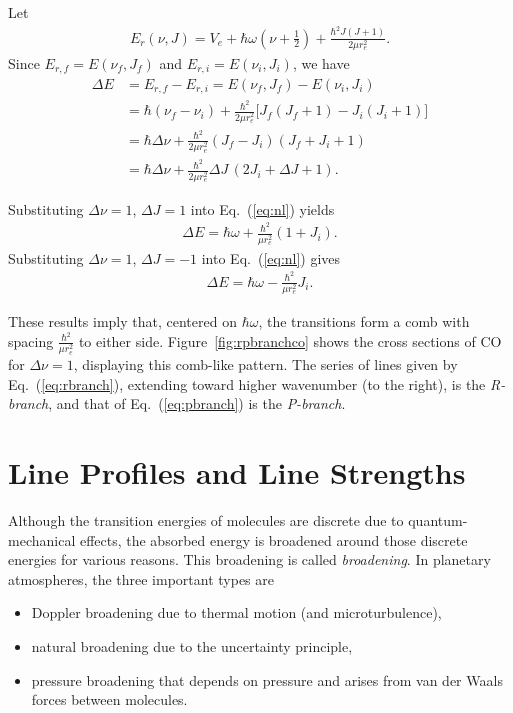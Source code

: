 Let
\begin{align}
E_r(\nu,J) = V_e + \hbar \omega \left( \nu + \frac{1}{2} \right) + \frac{\hbar^2 J(J+1)}{2 \mu r_e^2}.
\end{align}
Since $E_{r,f} = E(\nu_f, J_f)$ and $E_{r,i}=E(\nu_i,J_i)$, we have
\begin{align}
\Delta E &= E_{r,f} - E_{r,i} = E(\nu_f, J_f) - E(\nu_i,J_i) \\
&= \hbar (\nu_f - \nu_i) + \frac{\hbar^2}{2 \mu r_e^2} \bigl[J_f(J_f+1) - J_i(J_i+1)\bigr] \\
&= \hbar \Delta \nu + \frac{\hbar^2}{2 \mu r_e^2} (J_f-J_i)(J_f + J_i + 1) \\
\label{eq:nl}
&= \hbar \Delta \nu + \frac{\hbar^2}{2 \mu r_e^2} \Delta J \,(2 J_i + \Delta J + 1).
\end{align}

Substituting $\Delta \nu = 1$, $\Delta J = 1$ into Eq.~(\ref{eq:nl}) yields
\begin{align}
\label{eq:rbranch}
\Delta E = \hbar \omega + \frac{\hbar^2}{\mu r_e^2} (1 + J_i).
\end{align}
Substituting $\Delta \nu = 1$, $\Delta J = -1$ into Eq.~(\ref{eq:nl}) gives
\begin{align}
\label{eq:pbranch}
\Delta E = \hbar \omega - \frac{\hbar^2}{\mu r_e^2} J_i.
\end{align}

These results imply that, centered on $\hbar \omega$, the transitions form a comb with spacing $\frac{\hbar^2}{\mu r_e^2}$ to either side. Figure~\ref{fig:rpbranchco} shows the cross sections of CO for $\Delta \nu =1$, displaying this comb-like pattern. The series of lines given by Eq.~(\ref{eq:rbranch}), extending toward higher wavenumber (to the right), is the \emph{R-branch}, and that of Eq.~(\ref{eq:pbranch}) is the \emph{P-branch}.

\section{Line Profiles and Line Strengths}

Although the transition energies of molecules are discrete due to quantum-mechanical effects, the absorbed energy is broadened around those discrete energies for various reasons. This broadening is called \emph{broadening}. In planetary atmospheres, the three important types are
\begin{itemize}
    \item Doppler broadening due to thermal motion (and microturbulence),
    \item natural broadening due to the uncertainty principle,
    \item pressure broadening that depends on pressure and arises from van der Waals forces between molecules.
\end{itemize}

